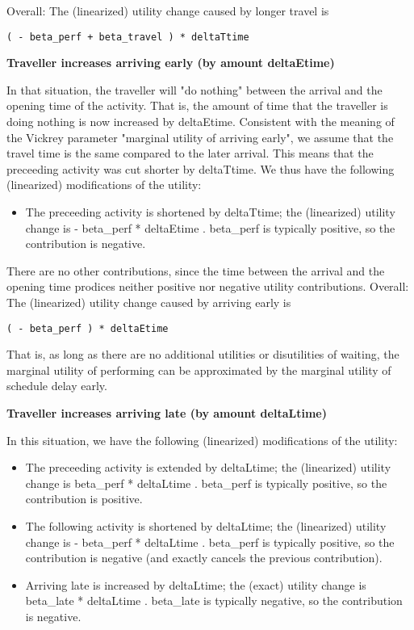 \documentclass[a4paper,11pt]{report}
\begin{document}
Overall: The (linearized) utility change caused by longer travel is
\begin{verbatim}
( - beta_perf + beta_travel ) * deltaTtime

\end{verbatim}

\textbf{Traveller increases arriving early (by amount deltaEtime)}

In that situation, the traveller will "do nothing" between the  arrival and the opening time of the activity. That is, the amount  of time that the traveller is doing nothing is now increased by  deltaEtime. Consistent with the meaning of the Vickrey parameter  "marginal utility of arriving early", we assume that the travel time is  the same compared to the later arrival. This means that the preceeding  activity was cut shorter by deltaTtime. We thus have the following  (linearized) modifications of the utility:
\begin{itemize}
	\item The preceeding activity is shortened by deltaTtime; the  (linearized) utility change is - beta\_perf * deltaEtime .  beta\_perf is typically positive, so the contribution is negative.
\end{itemize}

There are no other contributions, since the time between the  arrival and the opening time prodices neither positive nor negative  utility contributions. Overall: The (linearized) utility change  caused by arriving early is
\begin{verbatim}
( - beta_perf ) * deltaEtime

\end{verbatim}That is, as long as there are no  additional utilities or disutilities of waiting, the marginal utility of  performing can be approximated by the marginal utility of schedule  delay early.

\textbf{Traveller increases arriving late (by amount deltaLtime)}

In this situation, we have the following (linearized) modifications of the utility:
\begin{itemize}
	\item The preceeding activity is extended by deltaLtime; the  (linearized) utility change is beta\_perf * deltaLtime . beta\_perf  is typically positive, so the contribution is positive.
	\item The following activity is shortened by deltaLtime; the (linearized)  utility change is - beta\_perf * deltaLtime . beta\_perf is  typically positive, so the contribution is negative (and exactly cancels  the previous contribution).
	\item Arriving late is increased by deltaLtime; the (exact) utility change  is beta\_late * deltaLtime . beta\_late is typically negative, so  the contribution is negative.
\end{itemize}
\end{document}
